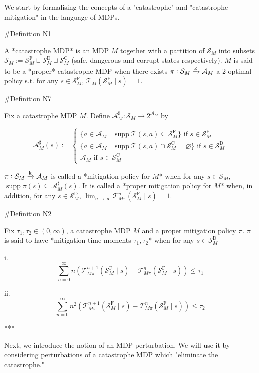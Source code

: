 \documentclass[a4paper]{article}
\newcommand{\Comment}[1]{}
\DeclareMathOperator{\Supp}{supp}
\newcommand{\AP}[1]{\left(#1\right)}
\newcommand{\Nats}{\mathbb{N}}
\newcommand{\M}{\xrightarrow{\textnormal{k}}}
\newcommand{\A}{\mathcal{A}}
\newcommand{\St}{\mathcal{S}}
\newcommand{\T}{\mathcal{T}}
\newcommand{\RMC}{\mathrm{C}}
\newcommand{\RMD}{\mathrm{D}}
\newcommand{\RMF}{\mathrm{F}}
\newcommand{\SF}{\St^{\RMF}}
\newcommand{\SD}{\St^{\RMD}}
\newcommand{\SC}{\St^{\RMC}}
\begin{document}
We start by formalising the concepts of a "catastrophe" and "catastrophe mitigation" in the language of MDPs.

\#Definition N1

A *catastrophe MDP* is an MDP $M$ together with a partition of $\St_M$ into subsets $\St_M:=\SF_M \sqcup \SD_M \sqcup \SC_M$ (safe, dangerous and corrupt states respectively). $M$ is said to be a *proper* catastrophe MDP when there exists $\pi: \St_M \M \A_M$ a 2-optimal policy s.t. for any $s\in\SF_M$, $\T_M\AP{\SF_M \mid s} = 1$.

\#Definition N7

Fix a catastrophe MDP $M$. Define $\A_M^\sharp: \St_M \rightarrow 2^{\A_M}$ by

$$\A_M^\sharp(s):=\begin{cases} \{a \in \A_M \mid \Supp{\T(s,a)} \subseteq \SF_M\} \text{ if } s \in \SF_M \\ \{a \in \A_M \mid \Supp{\T(s,a)} \cap \SC_M = \varnothing\} \text{ if } s \in \SD_M \\ \A_M \text{ if } s \in \SC_M \end{cases}$$

$\pi: \St_M \M \A_M$ is called a *mitigation policy for $M$* when for any $s \in \St_M$, $\Supp{\pi(s)} \subseteq \A_M^\sharp(s)$. It is called a *proper mitigation policy for $M$* when, in addition, for any $s \in \SD_M$, $\lim_{n \rightarrow \infty} \T_{M\pi}^n\AP{\SF_M \mid s} = 1$.

\Comment{Given $k \in \Nats$, $\pi$ is called a *k-mitigation policy for $M$* when, in addition

iii. For any $s \in \St_M \setminus \SC_M$, $\Supp{\pi(s)} \subseteq \A_M^k$.

$M$ is called *proper* when it has a 2-mitigation policy.}

\#Definition N2

Fix $\tau_1,\tau_2 \in (0,\infty)$, a catastrophe MDP $M$ and a proper mitigation policy $\pi$. $\pi$ is said to have *mitigation time moments $\tau_1,\tau_2$* when for any $s \in \SD_M$

i. $$\sum_{n=0}^\infty n \AP{\T_{M\pi}^{n+1}\AP{\SF_M \mid s}-\T_{M\pi}^{n}\AP{\SF_M \mid s}} \leq \tau_1$$

ii. $$\sum_{n=0}^\infty n^2 \AP{\T_{M\pi}^{n+1}\AP{\SF_M \mid s}-\T_{M\pi}^{n}\AP{\SF_M \mid s}} \leq \tau_2$$

***

Next, we introduce the notion of an MDP perturbation. We will use it by considering perturbations of a catastrophe MDP which "eliminate the catastrophe."
\end{document}
